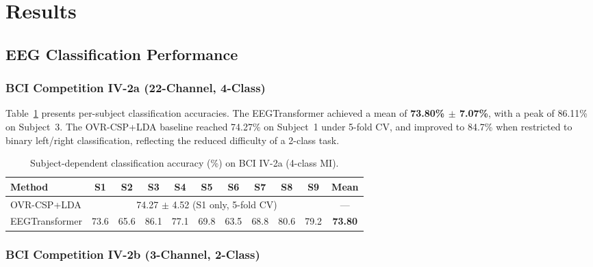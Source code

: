 \documentclass[12pt, a4paper]{article}
\begin{document}
\section{Results}

\subsection{EEG Classification Performance}

\subsubsection{BCI Competition IV-2a (22-Channel, 4-Class)}

Table~\ref{tab:iv2a_results} presents per-subject classification accuracies. The EEGTransformer achieved a mean of \textbf{73.80\% $\pm$ 7.07\%}, with a peak of 86.11\% on Subject~3. The OVR-CSP+LDA baseline reached 74.27\% on Subject~1 under 5-fold CV, and improved to 84.7\% when restricted to binary left/right classification, reflecting the reduced difficulty of a 2-class task.

\begin{table}[htbp]
\centering
\caption{Subject-dependent classification accuracy (\%) on BCI IV-2a (4-class MI).}
\label{tab:iv2a_results}
\begin{tabular}{lcccccccccc}
\toprule
\textbf{Method} & \textbf{S1} & \textbf{S2} & \textbf{S3} & \textbf{S4} & \textbf{S5} & \textbf{S6} & \textbf{S7} & \textbf{S8} & \textbf{S9} & \textbf{Mean} \\
\midrule
OVR-CSP+LDA & \multicolumn{9}{c}{74.27 $\pm$ 4.52 (S1 only, 5-fold CV)} & --- \\
EEGTransformer & 73.6 & 65.6 & 86.1 & 77.1 & 69.8 & 63.5 & 68.8 & 80.6 & 79.2 & \textbf{73.80} \\
\bottomrule
\end{tabular}
\end{table}

\subsubsection{BCI Competition IV-2b (3-Channel, 2-Class)}
\end{document}
